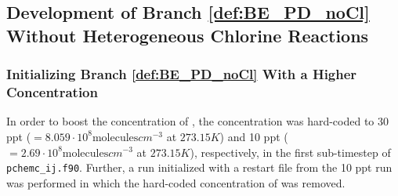 %









%


\subsection{Development of Branch \ref{def:BE_PD_noCl} Without Heterogeneous Chlorine Reactions}\label{sec:res_noHetCl}

\subsubsection{Initializing Branch \ref{def:BE_PD_noCl} With a Higher  Concentration}\label{sec:res_step2}

In order to boost the concentration of , the concentration was hard-coded to 30 ppt ($= 8.059\cdot10^8 \text{molecules}cm^{-3}$ at $273.15 K$) and 10 ppt ($= 2.69\cdot10^8 \text{molecules}cm^{-3}$ at $273.15 K$), respectively, in the first sub-timestep of \texttt{pchemc\_ij.f90}. Further, a run initialized with a restart file from the 10 ppt run was performed in which the hard-coded concentration of  was removed.

